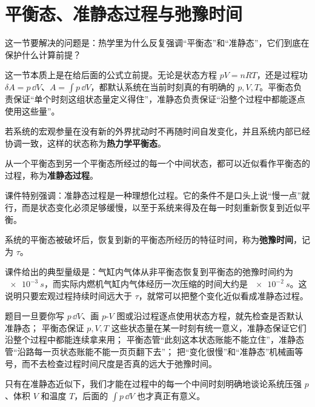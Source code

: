 \documentclass[lang=cn,11pt]{elegantbook}
\newcommand{\bridge}[1]{\begin{note}#1\end{note}}
\begin{document}
\section{平衡态、准静态过程与弛豫时间}

这一节要解决的问题是：热学里为什么反复强调“平衡态”和“准静态”，它们到底在保护什么计算前提？

\bridge{这一节本质上是在给后面的公式立前提。无论是状态方程 \(pV=nRT\)，还是过程功 \(\delta A=p\,\dd V\)、\(A=\int p\,\dd V\)，都默认系统在当前时刻真的有明确的 \(p,V,T\)。平衡态负责保证“单个时刻这组状态量定义得住”，准静态负责保证“沿整个过程中都能逐点使用这些量”。}

\begin{definition}[热力学平衡态]
若系统的宏观参量在没有新的外界扰动时不再随时间自发变化，并且系统内部已经协调一致，这样的状态称为\textbf{热力学平衡态}。
\end{definition}

\begin{definition}[准静态过程]
从一个平衡态到另一个平衡态所经过的每一个中间状态，都可以近似看作平衡态的过程，称为\textbf{准静态过程}。
\end{definition}

课件特别强调：准静态过程是一种理想化过程。它的条件不是口头上说“慢一点”就行，而是状态变化必须足够缓慢，以至于系统来得及在每一时刻重新恢复到近似平衡。

\begin{definition}[弛豫时间]
系统的平衡态被破坏后，恢复到新的平衡态所经历的特征时间，称为\textbf{弛豫时间}，记为 \(\tau\)。
\end{definition}

\begin{note}
课件给出的典型量级是：气缸内气体从非平衡态恢复到平衡态的弛豫时间约为 \(\SI{e-3}{s}\)，而实际内燃机气缸内气体经历一次压缩的时间大约是 \(\SI{e-2}{s}\)。这说明只要宏观过程持续时间远大于 \(\tau\)，就常可以把整个变化近似看成准静态过程。
\par
 题目一旦要你写 \(p\,\dd V\)、画 \(p\)-\(V\) 图或沿过程逐点使用状态方程，就先检查是否默认准静态； 平衡态保证 \(p,V,T\) 这些状态量在某一时刻有统一意义，准静态保证它们沿整个过程中都能连续拿来用； 平衡态管“此刻这本状态账能不能立住”，准静态管“沿路每一页状态账能不能一页页翻下去”； 把“变化很慢”和“准静态”机械画等号，而不去检查过程时间尺度是否真的远大于弛豫时间。
\end{note}

\bridge{只有在准静态近似下，我们才能在过程中的每一个中间时刻明确地谈论系统压强 \(p\)、体积 \(V\) 和温度 \(T\)，后面的 \(\int p\,\dd V\) 也才真正有意义。}
\end{document}
